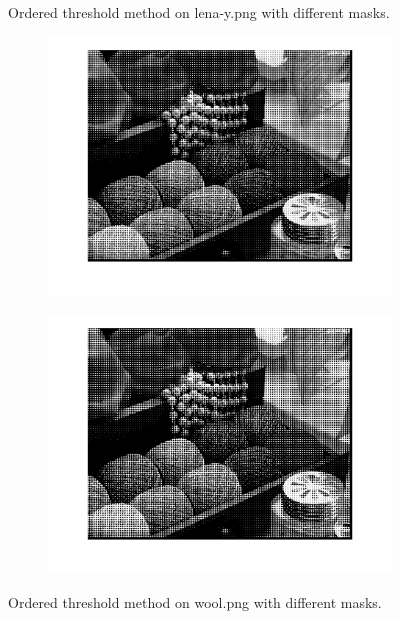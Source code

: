 \documentclass{article}
\begin{document}
\begin{figure}
\begin{subfigure}[b]{0.49\textwidth}
        \end{subfigure}
        \caption{Ordered threshold method on \textsf{lena-y.png} with different masks.}
        \label{fig:ordered_thresh_lena}
\end{figure}

 \begin{figure}
        \centering
        \begin{subfigure}[b]{0.49\textwidth}
            \includegraphics[width=\textwidth]{Images/wool_ordered_c6.png}
        \end{subfigure}
        \begin{subfigure}[b]{0.49\textwidth}
            \includegraphics[width=\textwidth]{Images/wool_ordered_e6.png}
        \end{subfigure}
        \caption{Ordered threshold method on \textsf{wool.png} with different masks.}
        \label{fig:ordered_thresh_wool}
\end{figure}
\end{document}
